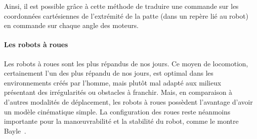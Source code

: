                     Ainsi, il est possible grâce à cette méthode de traduire une commande sur les coordonnées cartésiennes de l'extrémité de la patte (dans un repère lié au robot)  en commande sur chaque angle des moteurs.
            \paragraph{Les robots à roues}
                Les robots à roues sont les plus répandus de nos jours. Ce moyen de locomotion, certainement l'un des plus répandu de nos jours, est optimal dans les environnements créés par l'homme, mais plutôt mal adapté aux milieux présentant des irrégularités ou obstacles à franchir.
                Mais, en comparaison à d'autres modalités de déplacement, les robots à roues possèdent l'avantage d'avoir un modèle cinématique simple. La configuration des roues reste néanmoins importante pour la manœuvrabilité et la stabilité du robot, comme le montre Bayle~.
